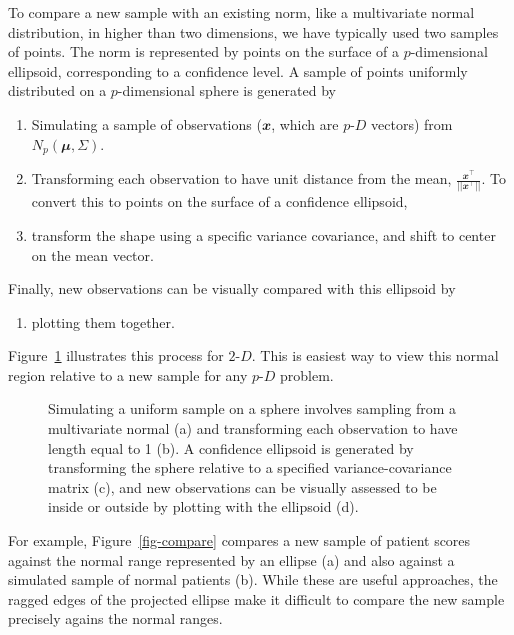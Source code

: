 \documentclass[
  12pt]{article}
\providecommand{\tightlist}{%
  \setlength{\itemsep}{0pt}\setlength{\parskip}{0pt}}\usepackage{longtable,booktabs,array}
\def\tightlist{}
\newcommand\pD{$p\text{-}D$}
\newcommand\gD{$2\text{-}D$}
\begin{document}
To compare a new sample with an existing norm, like a multivariate
normal distribution, in higher than two dimensions, we have typically
used two samples of points. The norm is represented by points on the
surface of a \(p\)-dimensional ellipsoid, corresponding to a confidence
level. A sample of points uniformly distributed on a \(p\)-dimensional
sphere is generated by

\begin{enumerate}
\def\labelenumi{\arabic{enumi}.}
\item
  Simulating a sample of observations (\(\mathbfit{x}\), which are \pD{}
  vectors) from \(N_p(\mathbfit{\mu}, \Sigma)\).
\item
  Transforming each observation to have unit distance from the mean,
  \(\frac{\mathbfit{x}^\top}{||\mathbfit{x}^\top||}\). To convert this
  to points on the surface of a confidence ellipsoid,
\item
  transform the shape using a specific variance covariance, and shift to
  center on the mean vector.
\end{enumerate}

Finally, new observations can be visually compared with this ellipsoid
by

\begin{enumerate}
\def\labelenumi{\arabic{enumi}.}
\setcounter{enumi}{3}
\tightlist
\item
  plotting them together.
\end{enumerate}

Figure~\ref{fig-ci} illustrates this process for \gD. This is easiest
way to view this normal region relative to a new sample for any \pD{}
problem.

\begin{figure}


\caption{\label{fig-ci}Simulating a uniform sample on a sphere involves
sampling from a multivariate normal (a) and transforming each
observation to have length equal to 1 (b). A confidence ellipsoid is
generated by transforming the sphere relative to a specified
variance-covariance matrix (c), and new observations can be visually
assessed to be inside or outside by plotting with the ellipsoid (d).}

\end{figure}%

For example, Figure~\ref{fig-compare} compares a new sample of patient
scores against the normal range represented by an ellipse (a) and also
against a simulated sample of normal patients (b). While these are
useful approaches, the ragged edges of the projected ellipse make it
difficult to compare the new sample precisely agains the normal ranges.
\end{document}
